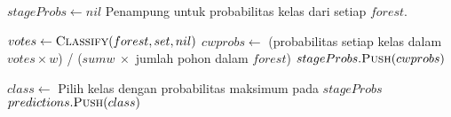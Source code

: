 \begin{center}
\begin{algorithmic}[1]
		\State $ stageProbs \gets nil $
		\Comment Penampung untuk probabilitas kelas dari setiap $forest$.

			\State $ votes \gets \Call{Classify}{forest, set, nil} $
			\State $ cwprobs \gets $
				(probabilitas setiap kelas dalam $votes \times w$) /
				($ sumw ~ \times $ jumlah pohon dalam $forest$)
			\State $ stageProbs.\Call{Push}{cwprobs} $
		\EndFor

		\State $ class \gets $ Pilih kelas dengan probabilitas maksimum pada $stageProbs$
		\State $ predictions.\Call{Push}{class} $
	\EndFor
	\\
	\State {}
\EndFunction
	\end{algorithmic}
\end{center}
